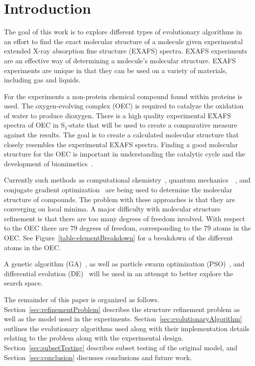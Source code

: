 \documentclass[conference]{IEEEtran}
\begin{document}
\section{Introduction}

The goal of this work is to explore different types of evolutionary algorithms in an effort to find the exact molecular structure of a molecule given experimental extended X-ray absorption fine structure (EXAFS) spectra. EXAFS experiments are an effective way of determining a molecule's molecular structure. EXAFS experiments are unique in that they can be used on a variety of materials, including gas and liquids. 

For the experiments a non-protein chemical compound found within proteins is used. The oxygen-evolving complex (OEC) is required to catalyze the oxidation of water to produce dioxygen. There is a high quality experimental EXAFS spectra of OEC in S$_1$-state that will be used to create a comparative measure against the results. The goal is to create a calculated molecular structure that closely resembles the experimental EXAFS spectra. Finding a good molecular structure for the OEC is important in understanding the catalytic cycle and the development of biomimetics~\cite{luber2011s1}.

Currently such methods as computational chemistry~\cite{hsiao2006exafs}, quantum mechanics~\cite{hsiao2006exafs}~\cite{sproviero2008model}, and conjugate gradient optimization~\cite{luber2011s1} are being used to determine the molecular structure of compounds. The problem with these approaches is that they are converging on local minima. A major difficulty with molecular structure refinement is that there are too many degrees of freedom involved. With respect to the OEC there are 79 degrees of freedom, corresponding to the 79 atoms in the OEC. See Figure~\ref{table:elementBreakdown} for a breakdown of the different atoms in the OEC. 

A genetic algorithm (GA)~\cite{banzhaf1997genetic}, as well as particle swarm optimization (PSO)~\cite{kennedy2010particle}, and differential evolution (DE)~\cite{storn1997differential} will be used in an attempt to better explore the search space.

The remainder of this paper is  organized as follows. Section~\ref{sec:refinementProblem} describes the structure refinement problem as well as the model used in the experiments. Section~\ref{sec:evolutionaryAlgorithm} outlines the evolutionary algorithms used along with their implementation details relating to the problem along with the experimental design. Section~\ref{sec:subsetTesting} describes subset testing of the original model, and Section~\ref{sec:conclusion} discusses conclusions and future work.
\end{document}
